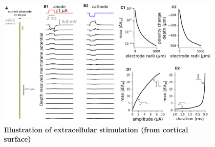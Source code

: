 \begin{figure}[!ht]
\begin{center}
\includegraphics[width=1\textwidth]{Figures/Stim/current_stimulation_example.png}
\end{center}
\caption{\textbf{Illustration of extracellular stimulation (from cortical surface)} 
}
\label{Stim:fig:current_stimulation_example}
\end{figure}